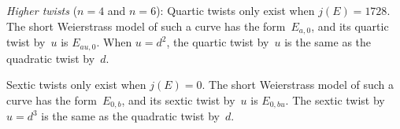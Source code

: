 \documentclass[12pt, reqno]{amsart}
\numberwithin{equation}{section}
\theoremstyle{definition}
\theoremstyle{remark}
\begin{document}
\emph{Higher twists} ($n=4$ and $n=6$): Quartic twists only exist when
$j(E)=1728$.  The short Weierstrass model of such a curve has the
form~$E_{a,0}$, and its quartic twist by~$u$ is $E_{au,0}$.  When
$u=d^2$, the quartic twist by~$u$ is the same as the quadratic twist
by~$d$.

Sextic twists only exist when $j(E)=0$.  The short Weierstrass model
of such a curve has the form~$E_{0,b}$, and its sextic twist by~$u$ is
$E_{0,bu}$.  The sextic twist by~$u=d^3$ is the same as the quadratic
twist by~$d$.

\begin{comment}
These are just the quartic twists for which the cocycle takes values
in $\{\pm1\}$.  Note that for elliptic curves with
$j$-invariant~$1728$, the quadratic twists by~$+d$ and by~$-d$ are
exactly the same, and in particular the quadratic twist by~$-1$ is trivial.
This is simplest to see from the explicit model $E_{ad^2,0}$ for the
twisted curve.  When $-1$ is a square in~$K$ then it is obvious that
the quadratic twist by~$-1$ is trivial, but this is also true when
$K(\sqrt{-1})\not=K$.  A more intrinsic explanation of this fact is
that the inflation map $H^1(G_K,\mu_2)\to H^1(G_K,\mu_4)$ is not
injective, but has kernel of order~$2$, when $-1$ is not a square
in~$K$.  This is most easily seen using the Kummer isomorphism, under
which the inflation map becomes the squaring map $K^*/(K^*)^2 \to
K^*/(K^*)^4$, which has $-1$ in its kernel.  Thus, when $j(E)=1728$,
the quadratic twists of~$E$ are parametrized not by $K^*/(K^*)^2$ but
by $K^*/\left<-1,(K^*)^2\right>$.
\end{comment}
\end{document}
